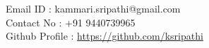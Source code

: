 \documentclass{resume} %
\newcommand{\blank}[1]{\hspace*{#1}}
\begin{document}
\blank{5 cm}
{Email ID} \blank{0.7 cm} :
kammari.sripathi@gmail.com \\
\blank{5 cm} 
{Contact No} \blank{0.3 cm} :
+91 9440739965 \\
\blank{5 cm}
{Github Profile : }
\url{https://github.com/ksripathi}
\sectionlineskip \hfill


  


\end{document}
